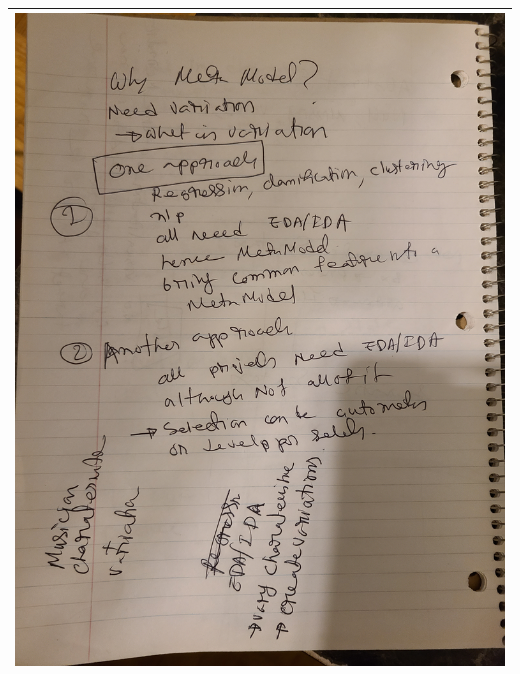 \begin{tabular}{|c|}
\includegraphics[scale=0.1, angle = -90]{sketch/4.jpg} \\
\hline
\end{tabular}

